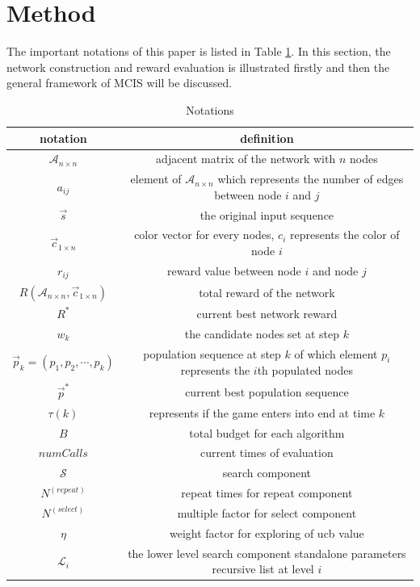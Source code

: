 \documentclass{article}
\begin{document}
\section{Method}
The important notations of this paper is listed in Table \ref{tab:notations}. In this section, the network construction and reward evaluation is illustrated firstly and then the general framework of MCIS will be discussed.

\begin{table}[htbp]
  \centering
  \caption{Notations}
    \begin{tabular}{cc}
    \toprule
    notation &  definition \\
    \midrule
    $\mathcal{A}_{n \times n}$ & adjacent matrix of the network with $n$ nodes\\
    $a_{ij}$ & element of $\mathcal{A}_{n \times n}$ which represents the number of edges between node $i$ and $j$ \\
    $\vec s$ & the original input sequence \\
    $\vec c_{1 \times n}$ & color vector for every nodes, $c_{i}$ represents the color of node $i$\\
    $r_{ij}$ & reward value between node $i$ and node $j$\\
    $R(\mathcal{A}_{n \times n}, \vec c_{1 \times n})$ & total reward of the network \\
    $R^{*}$ & current best network reward \\
    $w_{k}$ & the candidate nodes set at step $k$\\
    $\vec p_{k} = (p_{1}, p_{2}, \cdots, p_{k})$ & population sequence at step $k$ of which element $p_{i}$ represents the $i$th populated nodes\\
    $\vec p^{*}$ & current best population sequence \\
    $\tau(k)$ & represents if the game enters into end at time $k$\\
    $B$ & total budget for each algorithm \\
    $numCalls$ & current times of evaluation \\
    $\mathcal{S}$ & search component \\
    $N^{(repeat)}$ & repeat times for repeat component \\
    $N^{(select)}$ & multiple factor for select component \\
    $\eta$ & weight factor for exploring of ucb value \\
    $\mathcal{L}_{i}$ & the lower level search component standalone parameters recursive list at level $i$\\
    \bottomrule
    \end{tabular}%
  \label{tab:notations}%
\end{table}%
\end{document}
